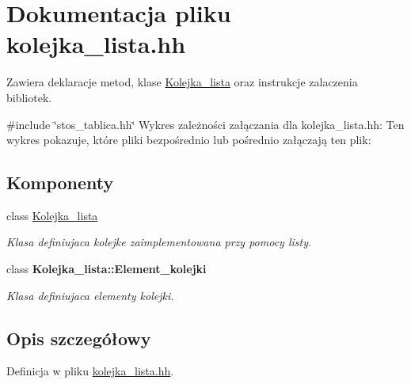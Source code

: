 \hypertarget{kolejka__lista_8hh}{\section{\-Dokumentacja pliku kolejka\-\_\-lista.\-hh}
\label{kolejka__lista_8hh}
}


\-Zawiera deklaracje metod, klase \hyperlink{class_kolejka__lista}{\-Kolejka\-\_\-lista} oraz instrukcje zalaczenia bibliotek.  


{\ttfamily \#include \char`\"{}stos\-\_\-tablica.\-hh\char`\"{}}\*
\-Wykres zależności załączania dla kolejka\-\_\-lista.\-hh\-:
\-Ten wykres pokazuje, które pliki bezpośrednio lub pośrednio załączają ten plik\-:
\subsection*{\-Komponenty}
\begin{DoxyCompactItemize}
\item 
class \hyperlink{class_kolejka__lista}{\-Kolejka\-\_\-lista}
\begin{DoxyCompactList}\small\item\em \-Klasa definiujaca kolejke zaimplementowana przy pomocy listy. \end{DoxyCompactList}\item 
class {\bfseries \-Kolejka\-\_\-lista\-::\-Element\-\_\-kolejki}
\begin{DoxyCompactList}\small\item\em \-Klasa definiujaca elementy kolejki. \end{DoxyCompactList}\end{DoxyCompactItemize}


\subsection{\-Opis szczegółowy}


\-Definicja w pliku \hyperlink{kolejka__lista_8hh_source}{kolejka\-\_\-lista.\-hh}.

